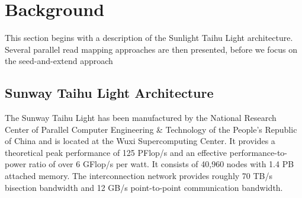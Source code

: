 \section{Background}
\label{Related Work}


This section begins with a description of the Sunlight Taihu Light architecture. Several parallel read mapping approaches are then presented,
before we focus on the seed-and-extend approach

\subsection{Sunway Taihu Light Architecture}
\label{Sunway Taihu Light}

The Sunway Taihu Light has been manufactured by the National Research
Center of Parallel Computer Engineering \& Technology of the
People's Republic of China and is located at the Wuxi Supercomputing
Center. It provides a theoretical peak performance of 125 PFlop/s and
an effective performance-to-power ratio of over 6 GFlop/s per watt. It
consists of 40,960 nodes with 1.4 PB attached memory. The
interconnection network provides roughly 70 TB/s bisection bandwidth
and 12 GB/s point-to-point communication bandwidth.

